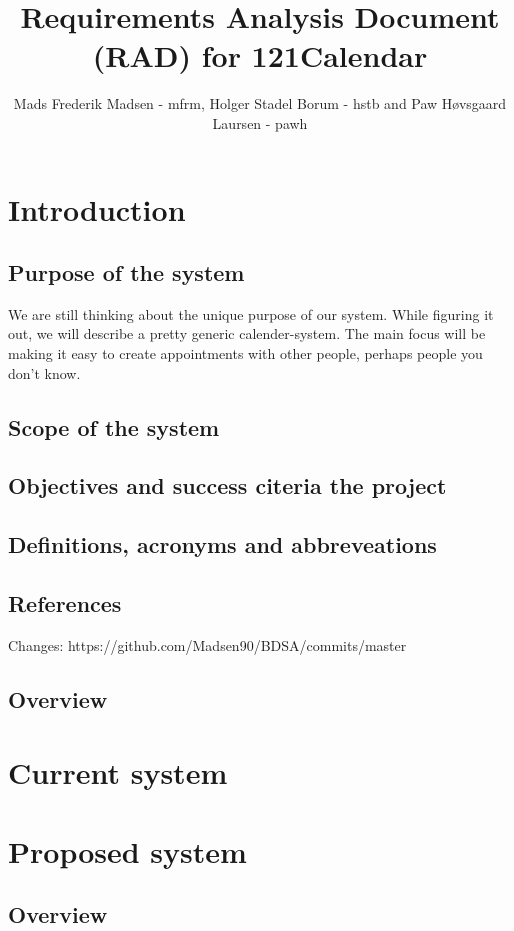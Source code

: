 \documentclass{article}
\begin{document}
\title{Requirements Analysis Document (RAD) for 121Calendar}
\author{Mads Frederik Madsen - mfrm, Holger Stadel Borum - hstb and Paw Høvsgaard Laursen - pawh}
\maketitle
\tableofcontents

\section{Introduction}
	\subsection{Purpose of the system}
	We are still thinking about the unique purpose of our system. 
	While figuring it out, we will describe a pretty generic calender-system. 
	The main focus will be making it easy to create appointments with other people, 
	perhaps people you don't know.
	\subsection{Scope of the system}

	\subsection{Objectives and success citeria the project}
	
	\subsection{Definitions, acronyms and abbreveations}
	
	\subsection{References}
	Changes:
	https://github.com/Madsen90/BDSA/commits/master
	\subsection{Overview}
\section{Current system}
\section{Proposed system}
	\subsection{Overview}
\end{document}
